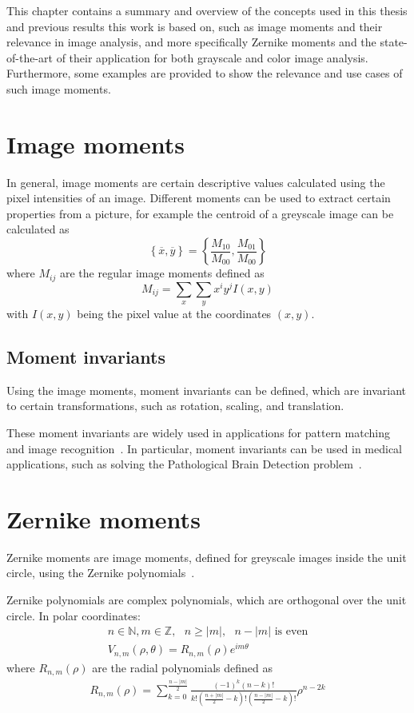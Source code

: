 This chapter contains a summary and overview of the concepts used in this thesis and previous results this work is based on, such as image moments and their relevance in image analysis, and more specifically Zernike moments and the state-of-the-art of their application for both grayscale and color image analysis. Furthermore, some examples are provided to show the relevance and use cases of such image moments.

\section{Image moments}
In general, image moments are certain descriptive values calculated using the pixel intensities of an image. Different moments can be used to extract certain properties from a picture, for example the centroid of a greyscale image can be calculated as
$$
\left\{ \overline{x}, \overline{y} \right\} = \left\{ \frac{M_{10}}{M_{00}},  \frac{M_{01}}{M_{00}} \right\}
$$ where $M_{ij}$ are the regular image moments defined as
$$
M_{ij} =  \sum_x \sum_y x^i y^j I(x,y) 
$$ with $I(x,y)$ being the pixel value at the coordinates $(x,y)$.

\subsection{Moment invariants}
Using the image moments, moment invariants can be defined, which are invariant to certain transformations, such as rotation, scaling, and translation.

These moment invariants are widely used in applications for pattern matching and image recognition~\cite{app1, app2, app3}. In particular, moment invariants can be used in medical applications, such as solving the Pathological Brain Detection problem~\cite{med_app_1}.

\section{Zernike moments}
Zernike moments are image moments, defined for greyscale images inside the unit circle, using the Zernike polynomials~\cite{zernike_moments}.

Zernike polynomials are complex polynomials, which are orthogonal over the unit circle. In polar coordinates:
\begin{gather*}
  n \in \mathds{N}, m \in \mathds{Z},\text{   } n \geq |m|,\text{   } n - |m| \text{ is even} \\
  V_{n,m}(\rho,\theta) = R_{n,m}(\rho) e^{i m\theta}
\end{gather*}
where $ R_{n,m}(\rho) $ are the radial polynomials defined as
\begin{gather*}
  R_{n,m}(\rho) = \sum_{k=0}^{\frac{n - |m|}{2}}\frac{(-1)^k (n - k)!}{k!\left(\frac{n + |m|}{2} - k\right)!\left(\frac{n - |m|}{2} - k\right)!}\rho^{n-2k}
\end{gather*}

